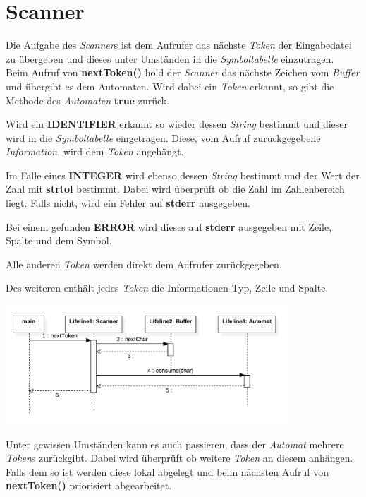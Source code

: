 \documentclass[
a4paper
]{scrreprt}
\begin{document}
	
	
	\section{Scanner}
	Die Aufgabe des \textit{Scanner}s ist dem Aufrufer das nächste \textit{Token} der Eingabedatei zu übergeben und dieses unter Umständen in die \textit{Symboltabelle} einzutragen.\\
	
	Beim Aufruf von \textbf{nextToken()} hold der \textit{Scanner} das nächste Zeichen vom \textit{Buffer} und übergibt es dem Automaten. Wird dabei ein \textit{Token} erkannt, so gibt die Methode des \textit{Automaten} \textbf{true} zurück.
	
	Wird ein \textbf{IDENTIFIER} erkannt so wieder dessen \textit{String} bestimmt und dieser wird in die \textit{Symboltabelle} eingetragen. Diese, vom Aufruf zurückgegebene \textit{Information}, wird dem \textit{Token} angehängt.
	
	Im Falle eines \textbf{INTEGER} wird ebenso dessen \textit{String} bestimmt und der Wert der Zahl mit \textbf{strtol} bestimmt. Dabei wird überprüft ob die Zahl im Zahlenbereich liegt. Falls nicht, wird ein Fehler auf \textbf{stderr} ausgegeben.
	
	Bei einem gefunden \textbf{ERROR} wird dieses auf \textbf{stderr} ausgegeben mit Zeile, Spalte und dem Symbol.
	
	Alle anderen \textit{Token} werden direkt dem Aufrufer zurückgegeben. 
	
	Des weiteren enthält jedes \textit{Token} die Informationen Typ, Zeile und Spalte.
	
	\begin{center}
		\includegraphics[width=0.8\textwidth]{./images/scanner_sequence.png}
	\end{center}
	
	Unter gewissen Umständen kann es auch passieren, dass der \textit{Automat} mehrere \textit{Token}s zurückgibt. Dabei wird überprüft ob weitere \textit{Token} an diesem anhängen. Falls dem so ist werden diese lokal abgelegt und beim nächsten Aufruf von \textbf{nextToken()} priorisiert abgearbeitet.
	
\end{document}
